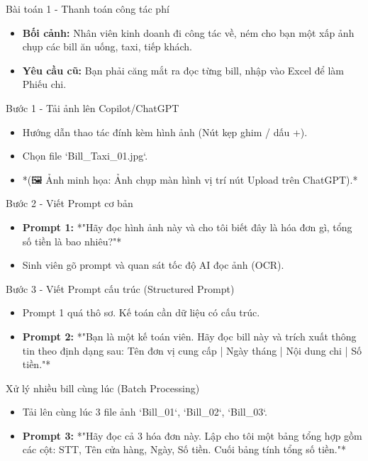 \documentclass[aspectratio=169]{beamer}
\begin{document}
\begin{frame}{Bài toán 1 - Thanh toán công tác phí}
    \begin{itemize}
        \item \textbf{Bối cảnh:} Nhân viên kinh doanh đi công tác về, ném cho bạn một xấp ảnh chụp các bill ăn uống, taxi, tiếp khách.
        \item \textbf{Yêu cầu cũ:} Bạn phải căng mắt ra đọc từng bill, nhập vào Excel để làm Phiếu chi.
    \end{itemize}
\end{frame}


\begin{frame}{Bước 1 - Tải ảnh lên Copilot/ChatGPT}
    \begin{itemize}
        \item Hướng dẫn thao tác đính kèm hình ảnh (Nút kẹp ghim / dấu +).
        \item Chọn file `Bill\_Taxi\_01.jpg`.
        \item *(🖼️ Ảnh minh họa: Ảnh chụp màn hình vị trí nút Upload trên ChatGPT).*
    \end{itemize}
\end{frame}


\begin{frame}{Bước 2 - Viết Prompt cơ bản}
    \begin{itemize}
        \item \textbf{Prompt 1:} *"Hãy đọc hình ảnh này và cho tôi biết đây là hóa đơn gì, tổng số tiền là bao nhiêu?"*
        \item Sinh viên gõ prompt và quan sát tốc độ AI đọc ảnh (OCR).
    \end{itemize}
\end{frame}


\begin{frame}{Bước 3 - Viết Prompt cấu trúc (Structured Prompt)}
    \begin{itemize}
        \item Prompt 1 quá thô sơ. Kế toán cần dữ liệu có cấu trúc.
        \item \textbf{Prompt 2:} *"Bạn là một kế toán viên. Hãy đọc bill này và trích xuất thông tin theo định dạng sau: Tên đơn vị cung cấp | Ngày tháng | Nội dung chi | Số tiền."*
    \end{itemize}
\end{frame}


\begin{frame}{Xử lý nhiều bill cùng lúc (Batch Processing)}
    \begin{itemize}
        \item Tải lên cùng lúc 3 file ảnh `Bill\_01`, `Bill\_02`, `Bill\_03`.
        \item \textbf{Prompt 3:} *"Hãy đọc cả 3 hóa đơn này. Lập cho tôi một bảng tổng hợp gồm các cột: STT, Tên cửa hàng, Ngày, Số tiền. Cuối bảng tính tổng số tiền."*
    \end{itemize}
\end{frame}
\end{document}
